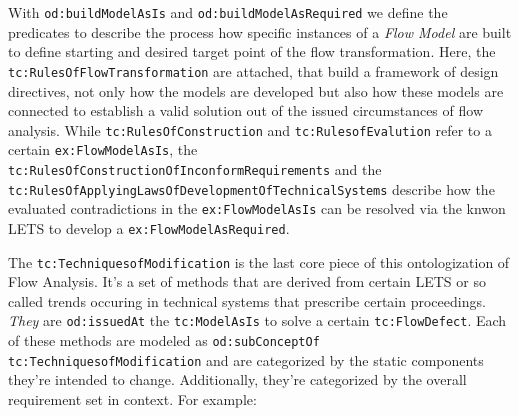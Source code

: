 \documentclass[a4paper,11pt]{article}
\begin{document}
    With \texttt{od:buildModelAsIs} and \texttt{od:buildModelAsRequired} we define the
    predicates to describe the process how specific instances of a \emph{Flow Model}
    are built to define starting and desired target point of the flow transformation.
    Here, the \texttt{tc:RulesOfFlowTransformation} are attached, that build a
    framework of design directives, not only how the models are developed but also
    how these models are connected to establish a valid solution out of the issued
    circumstances of flow analysis. While \texttt{tc:RulesOfConstruction} and
    \texttt{tc:RulesofEvalution} refer to a certain \texttt{ex:FlowModelAsIs}, 
    the \texttt{tc:RulesOfConstructionOfInconformRequirements} and the
    \texttt{tc:RulesOfApplyingLawsOfDevelopmentOfTechnicalSystems} describe
    how the evaluated contradictions in the \texttt{ex:FlowModelAsIs} can
    be resolved via the knwon LETS to develop a \texttt{ex:FlowModelAsRequired}.
    
    The \texttt{tc:TechniquesofModification} is the last core piece of this 
    ontologization of Flow Analysis. It's a set of methods that are derived 
    from certain LETS or so called trends occuring in technical systems 
    that prescribe certain proceedings. \cite{KoltzeSouchkov2017} \emph{They} 
    are \texttt{od:issuedAt} the \texttt{tc:ModelAsIs} to solve a certain
    \texttt{tc:FlowDefect}. Each of these methods are modeled as
    \texttt{od:subConceptOf tc:TechniquesofModification} and are categorized
    by the static components they're intended to change. Additionally,
    they're categorized by the overall requirement set in context. For example:
\end{document}
